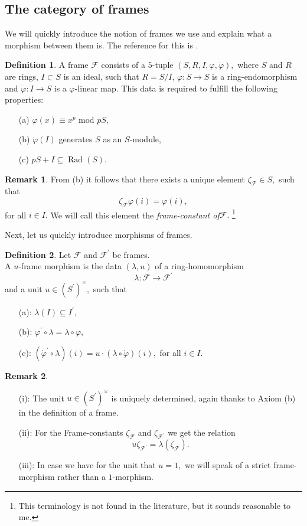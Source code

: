 \documentclass[a4paper,10,5 pt]{amsart}
\theoremstyle{definition}
\newtheorem{Definition}{Definition}
\newtheorem{Remark}{Remark}
\DeclareMathOperator{\Rad}{Rad}
\begin{document}
\subsection{The category of frames}
We will quickly introduce the notion of frames we use and explain what a morphism between them is. The reference for this is \cite[Section 2] {frames finite-groupschemes}.
\begin{Definition}
A frame $\mathcal{F}$ consists of a $5$-tuple $(S,R,I,\varphi,\dot{\varphi}),$ where $S$ and $R$ are rings, $I\subset S$ is an ideal, such that $R=S/I$, $\varphi\colon S\rightarrow S$ is a ring-endomorphism and $\dot{\varphi}\colon I \rightarrow S$ is a $\varphi$-linear map. This data is required to fulfill the following properties:
\begin{enumerate}
\item[(a)] $\varphi(x)\equiv x^{p} \text{ mod }pS$,
\item[(b)] $\dot{\varphi}(I)$ generates $S$ as an $S$-module,
\item[(c)] $pS + I\subseteq \Rad(S)$.
\end{enumerate}
\end{Definition}
\begin{Remark}
From (b) it follows that there exists a unique element $\zeta_{\mathcal{F}}\in S,$ such that
$$\zeta_{\mathcal{F}}\dot{\varphi}(i)=\varphi(i),$$
for all $i\in I.$ We will call this element the \textit{frame-constant of}$\mathcal{F}.$ \footnote{This terminology is not found in the literature, but it sounds reasonable to me.}
\end{Remark}
Next, let us quickly introduce morphisms of frames.
\begin{Definition}
Let $\mathcal{F}$ and $\mathcal{F}^{\prime}$ be frames.
\\
A $u$-frame morphism is the data $(\lambda,u)$ of a ring-homomorphism
$$
\lambda\colon \mathcal{F}\rightarrow \mathcal{F}^{\prime}
$$
and a unit $u\in (S^{\prime})^{\times},$ such that
\begin{enumerate}
\item[(a):] $\lambda(I)\subseteq I^{\prime},$
\item[(b):] $\varphi^{\prime}\circ \lambda=\lambda\circ \varphi,$
\item[(c):] $(\dot{\varphi}^{\prime}\circ\lambda)(i)=u\cdot (\lambda\circ \dot{\varphi})(i),$ for all $i\in I.$
\end{enumerate}
\end{Definition}
\begin{Remark}
\begin{enumerate}
\item[(i):]
The unit $u\in (S^{\prime})^{\times}$ is uniquely determined, again thanks to Axiom (b) in the definition of a frame.
\item[(ii):] For the Frame-constants $\zeta_{\mathcal{F}}$ and $\zeta_{\mathcal{F}^{\prime}}$ we get the relation
$$u \zeta_{\mathcal{F}^{\prime}}=\lambda(\zeta_{\mathcal{F}}).$$
\item[(iii):] In case we have for the unit that $u=1,$ we will speak of a strict frame-morphism rather than a $1$-morphism.
\end{enumerate}
\end{Remark}
\end{document}
